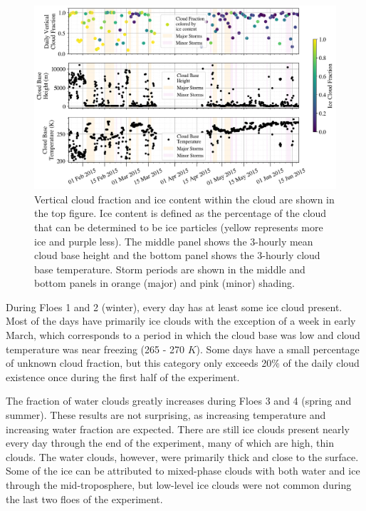 \begin{figure}[h]
    \centering
    \includegraphics[width=1\linewidth]{figures/chapter4/CloudSummary.png}
    \caption[Cloud fraction and phase, height, and temperature time series.]{Vertical cloud fraction and ice content within the cloud are shown in the top figure. Ice content is defined as the percentage of the cloud that can be determined to be ice particles (yellow represents more ice and purple less). The middle panel shows the 3-hourly mean cloud base height and the bottom panel shows the 3-hourly cloud base temperature. Storm periods are shown in the middle and bottom panels in orange (major) and pink (minor) shading.}
    \label{fig:cloudmacro}
\end{figure}

During Floes 1 and 2 (winter), every day has at least some ice cloud present. Most of the days have primarily ice clouds with the exception of a week in early March, which corresponds to a period in which the cloud base was low and cloud temperature was near freezing (265 - 270 $K$). Some days have a small percentage of unknown cloud fraction, but this category only exceeds 20$\%$ of the daily cloud existence once during the first half of the experiment. 

The fraction of water clouds greatly increases during Floes 3 and 4 (spring and summer). These results are not surprising, as increasing temperature and increasing water fraction are expected. There are still ice clouds present nearly every day through the end of the experiment, many of which are high, thin clouds. The water clouds, however, were primarily thick and close to the surface. Some of the ice can be attributed to mixed-phase clouds with both water and ice through the mid-troposphere, but low-level ice clouds were not common during the last two floes of the experiment.

